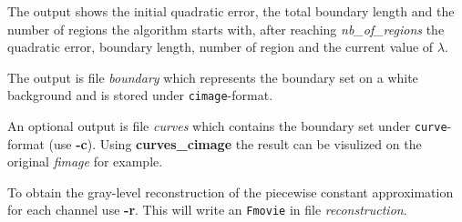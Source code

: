The output shows the initial quadratic error, the total boundary length and
the number of regions the algorithm starts with, after reaching 
{\em nb\_of\_regions} the quadratic error, boundary length, number of region
and the current value of $\lambda$.

The output is file {\em boundary} which represents the boundary set
on a white background and is stored under {\tt cimage}-format.

An optional output is file {\em curves}
 which contains the boundary set under 
{\tt curve}-format (use {\bf -c}).
Using {\bf curves\_cimage} the result can be visulized
on the original {\em fimage} for example.

To obtain the gray-level reconstruction of
the piecewise constant approximation 
for each channel use {\bf -r}.
This will write an {\tt Fmovie}
in file {\em reconstruction}.%
